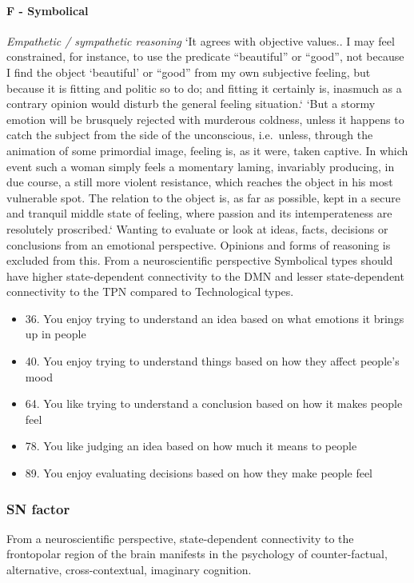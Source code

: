 \documentclass[11pt,a4paper]{article}
\begin{document}
\paragraph{F - Symbolical}
\emph{Empathetic / sympathetic reasoning}
`It agrees with objective values.. I may feel constrained, for instance, to use the predicate ``beautiful'' or ``good'', not because I find the object `beautiful' or ``good'' from my own subjective feeling, but because it is fitting and politic so to do; and fitting it certainly is, inasmuch as a contrary opinion would disturb the general feeling situation.`\cite[page.446]{jung1}
`But a stormy emotion will be brusquely rejected with murderous coldness, unless it happens to catch the subject from the side of the unconscious, i.e.\ unless, through the animation of some primordial image, feeling is, as it were, taken captive. In which event such a woman simply feels a momentary laming, invariably producing, in due course, a still more violent resistance, which reaches the object in his most vulnerable spot. The relation to the object is, as far as possible, kept in a secure and tranquil middle state of feeling, where passion and its intemperateness are resolutely proscribed.`\cite[p. 493]{jung1}
Wanting to evaluate or look at ideas, facts, decisions or conclusions from an emotional perspective. Opinions and forms of reasoning is excluded from this.
From a neuroscientific perspective Symbolical types should have higher state-dependent connectivity to the DMN and lesser state-dependent connectivity to the TPN compared to Technological types.
\begin{itemize}
\item 36. You enjoy trying to understand an idea based on what emotions it brings up in people
\item 40. You enjoy trying to understand things based on how they affect people's mood
\item 64. You like trying to understand a conclusion based on how it makes people feel
\item 78. You like judging an idea based on how much it means to people
\item 89. You enjoy evaluating decisions based on how they make people feel
\end{itemize}

\subsubsection{SN factor}
From a neuroscientific perspective, state-dependent connectivity to the frontopolar region of the brain manifests in the psychology of counter-factual, alternative, cross-contextual, imaginary cognition. \cite{sn1,sn2,sn3,sn4,sn5,sn6,sn7,sn8,sn9,sn10,sn11,sn12,sn13,sn14,sn15,sn16,sn17,sn18,sn19,sn20,sn21,sn22,sn23}
\end{document}
